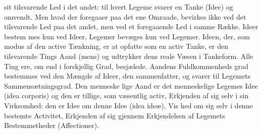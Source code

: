 \documentclass[12pt,a4paper]{book}
\begin{document}
sit tilsvarende Led i det andet: til hvert Legeme svarer en
Tanke (Idee) og omvendt. Men hvad der foregaaer paa det
ene Omraade, bevirkes ikke ved det tilsvarende Led paa det andet,
men ved et foregaaende Led i samme Række. Ideer bestem\-%
mes kun ved Ideer, Legemer bevæges kun ved Legemer.
Ideen, der, som modus af den active Tænkning, er at opfatte
som en activ Tanke, er den tilsvarende Tings Aand (mens) og
udtrykker dens reale Væsen i Tankeform. Alle Ting ere, om
end i forskjellig Grad, besjælede. Aandens Fuldkommenheds\-%
grad bestemmes ved den Mængde af Ideer, den sammenfatter,
og svarer til Legemets Sammensætningsgrad. Den menneske\-%
lige Aand er det menneskelige Legemes Idee (idea corporis)
og den er tillige, som væsentlig activ, Erkjenden af sig selv i
sin Virksomhed: den er Idee om denne Idee (idea ideæ), Vis\-%
hed om sig selv i denne bestemte Activitet, Erkjenden af sig
gjennem Erkjendelsen af Legemets Bestemmetheder (Affectioner).
\end{document}
